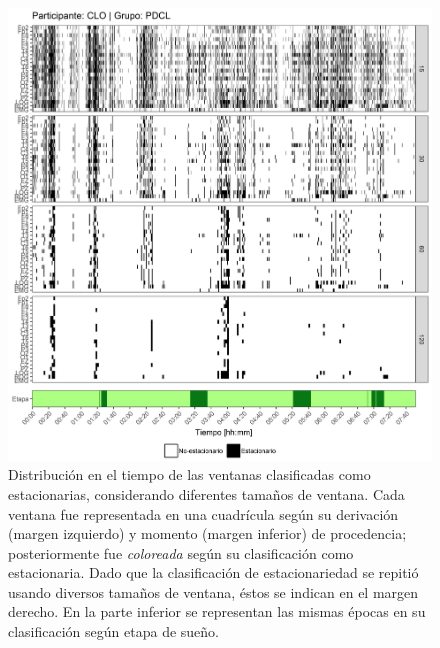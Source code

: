 \begin{figure}
\centering
\includegraphics[width=\linewidth]
{./scripts_graf_res/CLO_patrones_2.png}
\caption[Distribución en el tiempo de las ventanas clasificadas como estacionarias, considerando diferentes tamaños de ventana]{Distribución en el tiempo de las ventanas clasificadas como estacionarias, considerando diferentes tamaños de ventana. 
Cada ventana fue representada en una cuadrícula según su derivación (margen izquierdo) y momento (margen inferior) de procedencia; posteriormente fue \textit{coloreada} según su clasificación como estacionaria.
Dado que la clasificación de estacionariedad se repitió usando diversos tamaños de ventana, éstos se indican en el margen derecho.
En la parte inferior se representan las mismas épocas en su clasificación según etapa de sueño.}
\end{figure}



